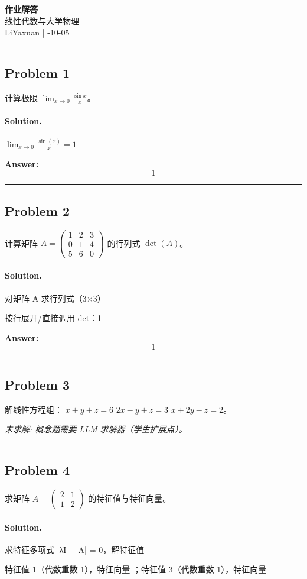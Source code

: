 \documentclass[12pt, a4paper]{article}
\newcommand{\problem}[1]{\subsection*{Problem #1}}
\newcommand{\solution}{\paragraph{Solution.}}
\begin{document}
\begin{center}
    {\LARGE\bfseries 作业解答} \\[0.5em]
    {\large 线性代数与大学物理} \\[0.3em]
    LiYaxuan \quad | -10-05
\end{center}

\hrule
\vspace{1em}
\problem{1}

计算极限 $\lim_{x \to 0} \frac{\sin x}{x}$。

\solution

$\lim_{x \to 0} \frac{\sin{\left(x \right)}}{x} = 1$

\textbf{Answer:}
\[\boxed{1}\]

\vspace{1em}
\hrule
\vspace{1em}

\problem{2}

计算矩阵 $A = \begin{pmatrix} 1 & 2 & 3 \\ 0 & 1 & 4 \\ 5 & 6 & 0 \end{pmatrix}$ 的行列式 $\det(A)$。

\solution

对矩阵 A 求行列式（3×3）

按行展开/直接调用 det：1

\textbf{Answer:}
\[\boxed{1}\]

\vspace{1em}
\hrule
\vspace{1em}

\problem{3}

解线性方程组：
$x + y + z = 6$
$2x - y + z = 3$
$x + 2y - z = 2$。

\textit{\color{red} 未求解: 概念题需要 LLM 求解器（学生扩展点）。}

\vspace{1em}
\hrule
\vspace{1em}

\problem{4}

求矩阵 $A = \begin{pmatrix} 2 & 1 \\ 1 & 2 \end{pmatrix}$ 的特征值与特征向量。

\solution

求特征多项式 |λI − A| = 0，解特征值

特征值 1（代数重数 1），特征向量 \left[\begin{matrix}-1\\1\end{matrix}\right]；特征值 3（代数重数 1），特征向量 \left[\begin{matrix}1\\1\end{matrix}\right]
\end{document}
